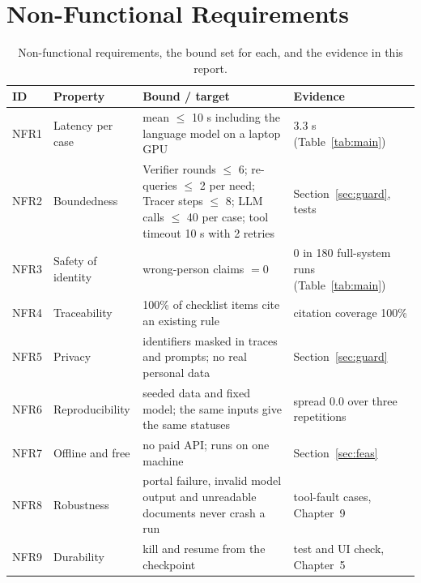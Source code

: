 \documentclass[12pt,a4paper,oneside]{report}
\begin{document}
\section{Non-Functional Requirements}
\begin{table}[H]
\centering\small{}
\caption[Non-functional requirements]{Non-functional requirements, the bound set for each, and the evidence in this report.}\label{tab:nfr}
\renewcommand{\arraystretch}{1.15}
\begin{tabularx}{\linewidth}{@{}l p{3.6cm} X l@{}}
\toprule
\textbf{ID} & \textbf{Property} & \textbf{Bound / target} & \textbf{Evidence} \\ \midrule
NFR1 & Latency per case & mean $\le$ 10 s including the language model on a laptop GPU & 3.3 s (Table~\ref{tab:main}) \\
NFR2 & Boundedness & Verifier rounds $\le$ 6; re-queries $\le$ 2 per need; Tracer steps $\le$ 8; LLM calls $\le$ 40 per case; tool timeout 10 s with 2 retries & Section~\ref{sec:guard}, tests \\
NFR3 & Safety of identity & wrong-person claims $=0$ & 0 in 180 full-system runs (Table~\ref{tab:main}) \\
NFR4 & Traceability & 100\% of checklist items cite an existing rule & citation coverage 100\% \\
NFR5 & Privacy & identifiers masked in traces and prompts; no real personal data & Section~\ref{sec:guard} \\
NFR6 & Reproducibility & seeded data and fixed model; the same inputs give the same statuses & spread 0.0 over three repetitions \\
NFR7 & Offline and free & no paid API; runs on one machine & Section~\ref{sec:feas} \\
NFR8 & Robustness & portal failure, invalid model output and unreadable documents never crash a run & tool-fault cases, Chapter~9 \\
NFR9 & Durability & kill and resume from the checkpoint & test and UI check, Chapter~5 \\ \bottomrule
\end{tabularx}
\end{table}
\end{document}
